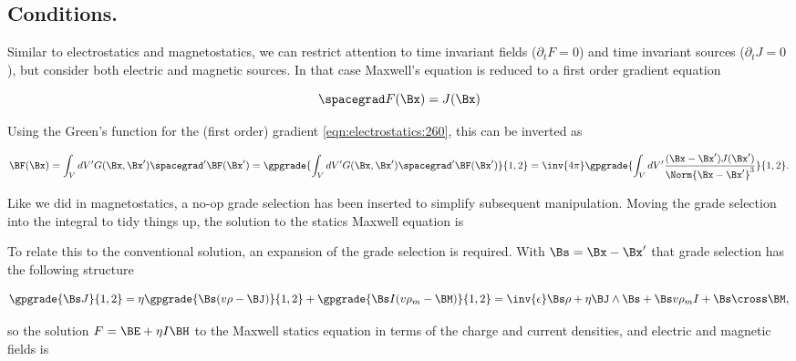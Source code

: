 %
%
\subsection{Conditions.}
Similar to electrostatics and magnetostatics, we can restrict attention to time invariant fields (\( \partial_t F = 0\)) and time invariant sources (\(\partial_t J = 0\)), but consider both electric and magnetic sources.  In that case Maxwell's equation is reduced to a first order gradient equation

\begin{dmath}\label{eqn:statics:20}
\spacegrad F(\Bx) = J(\Bx)
\end{dmath}

Using the Green's function for the (first order) gradient \cref{eqn:electrostatics:260}, this can be inverted as

\begin{dmath}\label{eqn:statics:40}
\BF(\Bx)
= \int_V dV' G(\Bx, \Bx') \spacegrad' \BF(\Bx')
= \gpgrade{\int_V dV' G(\Bx, \Bx') \spacegrad' \BF(\Bx')}{1,2}
= \inv{4\pi} \gpgrade{\int_V dV' \frac{(\Bx - \Bx') J(\Bx')}{\Norm{\Bx - \Bx'}^3} }{1,2}.
\end{dmath}

Like we did in magnetostatics, a no-op grade selection has been inserted to simplify subsequent manipulation.  Moving the grade selection into the integral to tidy things up, the solution to the statics Maxwell equation is


To relate this to the conventional solution, an expansion of the grade selection is required.  With \( \Bs = \Bx -\Bx' \) that grade selection has the following structure

\begin{dmath}\label{eqn:statics:60}
\gpgrade{\Bs J}{1,2}
=
\eta \gpgrade{\Bs (v \rho - \BJ)}{1,2}
+
\gpgrade{\Bs I(v \rho_m - \BM)}{1,2}
=
\inv{\epsilon} \Bs \rho + \eta \BJ \wedge \Bs + \Bs v \rho_m I + \Bs \cross \BM,
\end{dmath}

so the solution \( F = \BE + \eta I \BH \) to the Maxwell statics equation in terms of the charge and current densities, and electric and magnetic fields is

